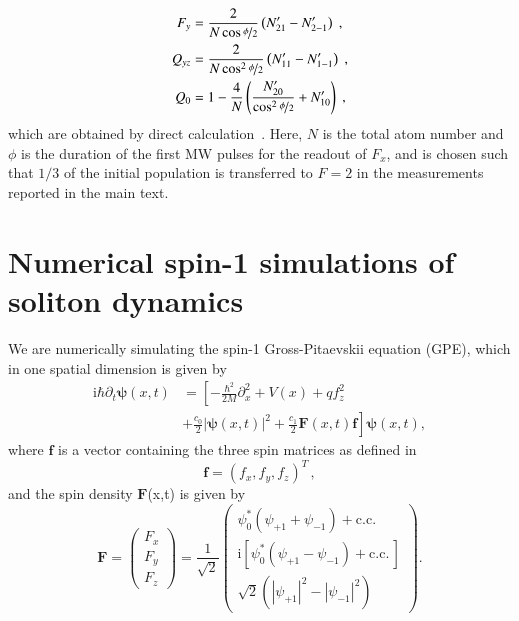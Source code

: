\documentclass[aps,

               pra,
               twocolumn,
               amsmath,
               amssymb,
               superscriptaddress,
               reprint,
               10pt
              ]{revtex4-2}
\begin{document}
\begin{appendix}
\begin{align}
    F_y &= \frac{2}{N \cos{\nicefrac{\phi}{2}}} \left( N_{21}^{\prime} - N_{2-1}^{\prime} \right) \;, \\
    Q_{yz} &= \frac{2}{N \cos^2{\nicefrac{\phi}{2}}} \left( N_{11}^{\prime} - N_{1-1}^{\prime} \right)  \;, \\
    Q_0 &= 1 - \frac{4}{N} \left( \frac{N_{20}^{\prime}} {\cos^2{}\nicefrac{\phi}{2}} + N_{10}^{\prime} \right) \;,
\end{align}
which are obtained by direct calculation~\cite{Kunkel2019,2025FlammNovel}. Here, $N$ is the total atom number and $\phi$ is the duration of the first MW pulses for the readout of $F_x$, and is chosen such that $1/3$ of the initial population is transferred to $F=2$ in the measurements reported in the main text.


\section{Numerical spin-1 simulations of soliton dynamics}\label{app:Numerics}
We are numerically simulating the spin-1 Gross-Pitaevskii equation (GPE), which in one spatial dimension is given by
\begin{align}
    \mathrm{i} \hbar \partial_t \boldsymbol{\psi}(x,t) &= \left[-\frac{\hbar^2}{2M}\partial_x^2+V(x)+qf_z^2 \right. \nonumber \\
    &+\left.\frac{c_0}{2}|\boldsymbol{\psi}(x,t)|^2+\frac{c_1}{2}\boldsymbol{F}(x,t)\boldsymbol{f} \right]\boldsymbol{\psi}(x,t),
\end{align}
where $\boldsymbol{f}$ is a vector containing the three spin matrices as defined in \cite{Kawaguchi2012}
\begin{equation}
    \boldsymbol{f} = (f_x,f_y,f_z)^T \, ,
\end{equation}
and the spin density $\boldsymbol{F}$(x,t) is given by
\begin{equation}
    \boldsymbol{F}=\begin{pmatrix}
        F_x \\
        F_y \\
        F_z
    \end{pmatrix}
    =
    \frac{1}{\sqrt{2}}
    \begin{pmatrix}
        \psi_0^*\left(\psi_{+1}+\psi_{-1}\right)+\mathrm{c.c.}\,\\
        \mathrm{i}\left[\psi_0^*\left(\psi_{+1}-\psi_{-1}\right)+\mathrm{c.c.}\,\right]\\
        \sqrt{2} \left(|\psi_{+1}|^2-|\psi_{-1}|^2\right)
    \end{pmatrix}.

\end{equation}
\end{appendix}
\end{document}
